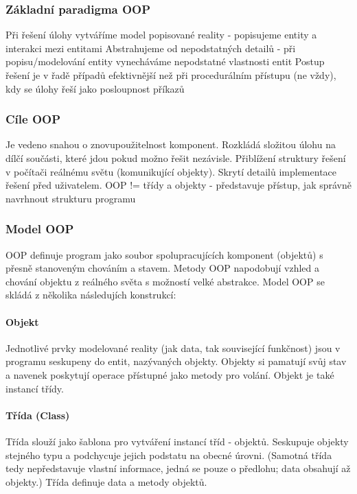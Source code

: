 \documentclass[10pt,a4paper]{article}
\begin{document}
\subsubsection{Základní paradigma OOP}
Při řešení úlohy vytváříme model popisované reality - popisujeme entity a interakci mezi entitami
Abstrahujeme od nepodstatných detailů - při popisu/modelování entity vynecháváme nepodstatné vlastnosti entit
Postup řešení je v řadě případů efektivnější než při procedurálním přístupu (ne vždy), kdy se úlohy řeší jako posloupnost příkazů 
\subsubsection{Cíle OOP}
Je vedeno snahou o znovupoužitelnost komponent.
Rozkládá složitou úlohu na dílčí součásti, které jdou pokud možno řešit nezávisle.
Přiblížení struktury řešení v počítači reálnému světu (komunikující objekty).
Skrytí detailů implementace řešení před uživatelem.
OOP != třídy a objekty - představuje přístup, jak správně navrhnout strukturu programu

\subsubsection{Model OOP}
OOP definuje program jako soubor spolupracujících komponent (objektů) s přesně stanoveným chováním a stavem. Metody OOP napodobují vzhled a chování objektu z reálného světa s možností velké abstrakce. Model OOP se skládá z několika následujích konstrukcí:

\paragraph{Objekt} 

Jednotlivé prvky modelované reality (jak data, tak související funkčnost) jsou v programu seskupeny do entit, nazývaných objekty. Objekty si pamatují svůj stav a navenek poskytují operace přístupné jako metody pro volání. Objekt je také instancí třídy.

 

\paragraph{Třída (Class)}

Třída slouží jako šablona pro vytváření instancí tříd - objektů. Seskupuje objekty stejného typu a podchycuje jejich podstatu na obecné úrovni.  (Samotná třída tedy nepředstavuje vlastní informace, jedná se pouze o předlohu; data obsahují až objekty.) Třída definuje data a metody objektů.
\end{document}
